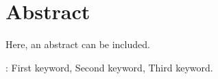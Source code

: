 \chapter*{Abstract}\label{abstract}
\pagestyle{MyThesisStyle}

Here, an abstract can be included.


\vfill
{}:  First keyword, Second keyword, Third keyword.
